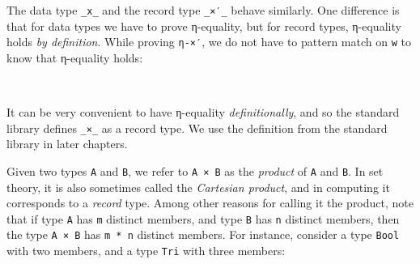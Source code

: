 The data type \texttt{\_x\_} and the record type \texttt{\_×′\_} behave
similarly. One difference is that for data types we have to prove
η-equality, but for record types, η-equality holds \emph{by definition}.
While proving \texttt{η-×′}, we do not have to pattern match on
\texttt{w} to know that η-equality holds:

\begin{fence}
\begin{code}%
\>[0]\AgdaSpace{}%
\AgdaSymbol{:}\AgdaSpace{}%
\AgdaSpace{}%
\AgdaSymbol{\{}\AgdaSpace{}%
\AgdaSpace{}%
\AgdaSymbol{:}\AgdaSpace{}%
\AgdaSymbol{\}}\AgdaSpace{}%
\AgdaSymbol{(}\AgdaSpace{}%
\AgdaSymbol{:}\AgdaSpace{}%
\AgdaSpace{}%
\AgdaSpace{}%
\AgdaSymbol{)}\AgdaSpace{}%
\AgdaSpace{}%
\AgdaSpace{}%
\AgdaSpace{}%
\AgdaSpace{}%
\AgdaOperator{\AgdaInductiveConstructor{,}}\AgdaSpace{}%
\AgdaSpace{}%
\AgdaSpace{}%
\AgdaSpace{}%
\AgdaSpace{}%
\<%
\\
\>[0]\AgdaSpace{}%
\AgdaSpace{}%
\AgdaSymbol{=}\AgdaSpace{}%
\<%
\end{code}
\end{fence}

It can be very convenient to have η-equality \emph{definitionally}, and
so the standard library defines \texttt{\_×\_} as a record type. We use
the definition from the standard library in later chapters.

Given two types \texttt{A} and \texttt{B}, we refer to \texttt{A\ ×\ B}
as the \emph{product} of \texttt{A} and \texttt{B}. In set theory, it is
also sometimes called the \emph{Cartesian product}, and in computing it
corresponds to a \emph{record} type. Among other reasons for calling it
the product, note that if type \texttt{A} has \texttt{m} distinct
members, and type \texttt{B} has \texttt{n} distinct members, then the
type \texttt{A\ ×\ B} has \texttt{m\ *\ n} distinct members. For
instance, consider a type \texttt{Bool} with two members, and a type
\texttt{Tri} with three members:

